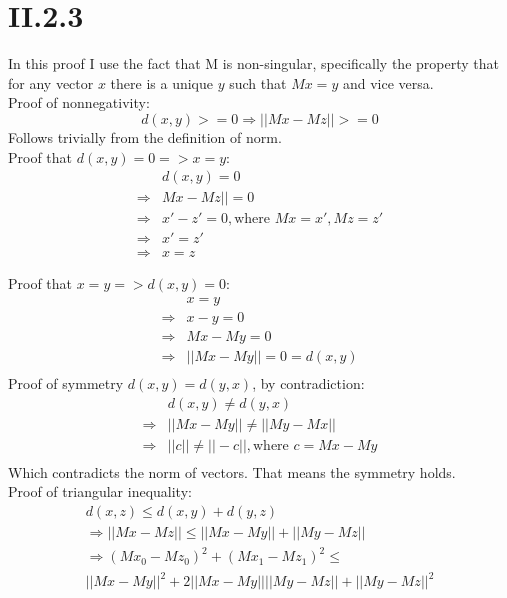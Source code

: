 \documentclass[a4paper,10pt]{article}
\begin{document}
\section*{II.2.3}
In this proof I use the fact that M is non-singular, specifically the property that for any vector $x$ there is a unique $y$ such that $Mx=y$ and vice versa.\\

Proof of nonnegativity:
\[
d(x,y)>=0 \Rightarrow ||Mx-Mz||>=0
\]
Follows trivially from the definition of norm.\\

Proof that $d(x,y)=0 => x=y$:
\begin{align*}
&d(x,y)=0\\
\Rightarrow &Mx-Mz||=0\\
\Rightarrow &x'-z'=0, \text{where }Mx=x', Mz=z'\\
\Rightarrow &x'=z'\\
\Rightarrow &x=z
\end{align*}

Proof that $x=y => d(x,y)=0$:
\begin{align*}
&x=y\\
\Rightarrow& x-y=0\\
\Rightarrow& Mx-My=0\\
\Rightarrow& ||Mx-My||=0=d(x,y)\\
\end{align*}
Proof of symmetry $d(x,y)=d(y,x)$, by contradiction:
\begin{align*}
&d(x,y)\neq d(y,x)\\
\Rightarrow &||Mx-My||\neq ||My-Mx||\\
\Rightarrow &||c||\neq ||-c||, \text{where } c= Mx-My\\
\end{align*}
Which contradicts the norm of vectors. That means the
symmetry holds.\\
Proof of triangular inequality:
\begin{align*}
d(x,z) \leq d(x,y) + d(y,z)\\
\Rightarrow||Mx-Mz|| \leq ||Mx-My|| + ||My-Mz||\\
\Rightarrow  (Mx_0-Mz_0)^2+(Mx_1-Mz_1)^2 \leq\\
             ||Mx-My||^2+2||Mx-My||||My-Mz||+||My-Mz||^2
\end{align*}
\end{document}
